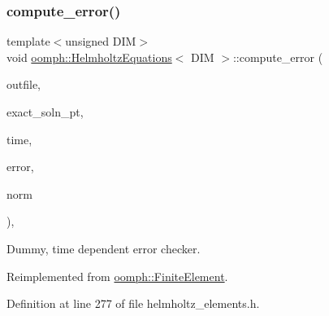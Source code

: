 \subsubsection{\texorpdfstring{compute\+\_\+error()}{compute\_error()}\hspace{0.1cm}{\footnotesize\ttfamily [2/2]}}
{\footnotesize\ttfamily template$<$unsigned D\+IM$>$ \\
void \hyperlink{classoomph_1_1HelmholtzEquations}{oomph\+::\+Helmholtz\+Equations}$<$ D\+IM $>$\+::compute\+\_\+error (\begin{DoxyParamCaption}\item[{std\+::ostream \&}]{outfile,  }\item[{\hyperlink{classoomph_1_1FiniteElement_ad4ecf2b61b158a4b4d351a60d23c633e}{Finite\+Element\+::\+Unsteady\+Exact\+Solution\+Fct\+Pt}}]{exact\+\_\+soln\+\_\+pt,  }\item[{const double \&}]{time,  }\item[{double \&}]{error,  }\item[{double \&}]{norm }\end{DoxyParamCaption})\hspace{0.3cm}{\ttfamily [inline]}, {\ttfamily [virtual]}}



Dummy, time dependent error checker. 



Reimplemented from \hyperlink{classoomph_1_1FiniteElement_a7f67853506dc73fa6b7505108de22d1f}{oomph\+::\+Finite\+Element}.



Definition at line 277 of file helmholtz\+\_\+elements.\+h.

\mbox{\label{classoomph_1_1HelmholtzEquations_a4559bf3e98ee0efa33f6efc11292ad3e}} 
